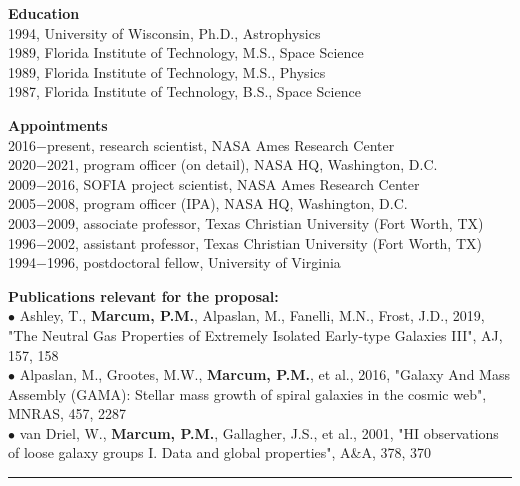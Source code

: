 \textbf{Education}\\
1994, University of Wisconsin, Ph.D., Astrophysics\\
1989, Florida Institute of Technology, M.S., Space Science\\
1989, Florida Institute of Technology, M.S., Physics\\
1987, Florida Institute of Technology, B.S., Space Science
\par \vspace{-0.5em}
\textbf{Appointments}\\
2016$-$present, research scientist, NASA Ames Research Center\\
2020$-$2021, program officer (on detail), NASA HQ, Washington, D.C.\\
2009$-$2016, SOFIA project scientist, NASA Ames Research Center\\
2005$-$2008, program officer (IPA), NASA HQ, Washington, D.C.\\
2003$-$2009, associate professor, Texas Christian University (Fort Worth, TX)\\
1996$-$2002, assistant professor, Texas Christian University (Fort Worth, TX)\\
1994$-$1996, postdoctoral fellow, University of Virginia
\par \vspace{-0.5em}
\textbf{Publications relevant for the proposal:}\\
{\scriptsize{$\bullet$}} Ashley, T., \textbf{Marcum, P.M.}, Alpaslan, M., Fanelli, M.N., Frost, J.D., 2019, "The Neutral Gas Properties of Extremely Isolated Early-type Galaxies III", AJ, 157, 158\\
{\scriptsize{$\bullet$}} Alpaslan, M., Grootes, M.W., \textbf{Marcum, P.M.}, et al., 2016, "Galaxy And Mass Assembly (GAMA): Stellar mass growth of spiral galaxies in the cosmic web", MNRAS, 457, 2287\\
{\scriptsize{$\bullet$}} van Driel, W., \textbf{Marcum, P.M.}, Gallagher, J.S., et al., 2001, "HI observations of loose galaxy groups I. Data and global properties", A\&A, 378, 370
\medskip \hrule \vspace{5pt} \medskip